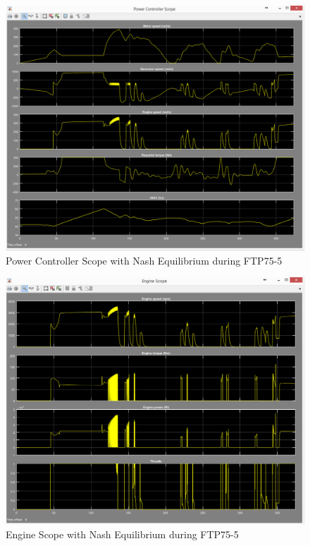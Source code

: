 \begin{figure}[h]
\centering
\includegraphics[scale=0.4]{figures/NashEquilibrium/FTP75-5/powerController16Juni}
\caption{Power Controller Scope with Nash Equilibrium during FTP75-5}
\label{fig:pcne5}
\end{figure}

\begin{figure}[h]
\centering
\includegraphics[scale=0.37]{figures/NashEquilibrium/FTP75-5/engine16Juni}
\caption{Engine Scope with Nash Equilibrium during FTP75-5}
\label{fig:ene5}
\end{figure}

